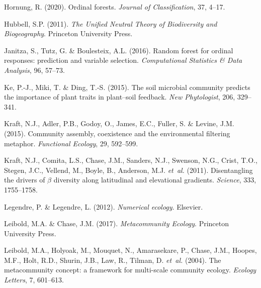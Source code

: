 \begin{thebibliography}{70}
	Hornung, R. (2020).
	\newblock Ordinal forests.
	\newblock \emph{Journal of Classification}, 37, 4--17.
	
	Hubbell, S.P. (2011).
	\newblock \emph{The Unified Neutral Theory of Biodiversity and Biogeography}.
	\newblock Princeton University Press.
	
	Janitza, S., Tutz, G. \& Boulesteix, A.L. (2016).
	\newblock Random forest for ordinal responses: prediction and variable
	selection.
	\newblock \emph{Computational Statistics \& Data Analysis}, 96, 57--73.
	
	Ke, P.-J., Miki, T. \& Ding, T.-S. (2015).
	\newblock The soil microbial community predicts the importance of plant traits
	in plant--soil feedback.
	\newblock \emph{New Phytologist}, 206, 329--341.
	
	Kraft, N.J., Adler, P.B., Godoy, O., James, E.C., Fuller, S. \& Levine, J.M.
	(2015).
	\newblock Community assembly, coexistence and the environmental filtering
	metaphor.
	\newblock \emph{Functional Ecology}, 29, 592--599.
	
	Kraft, N.J., Comita, L.S., Chase, J.M., Sanders, N.J., Swenson, N.G., Crist,
	T.O., Stegen, J.C., Vellend, M., Boyle, B., Anderson, M.J. \emph{et~al.}
	(2011).
	\newblock Disentangling the drivers of $\beta$ diversity along latitudinal and
	elevational gradients.
	\newblock \emph{Science}, 333, 1755--1758.
	
	Legendre, P. \& Legendre, L. (2012).
	\newblock \emph{Numerical ecology}.
	\newblock Elsevier.
	
	Leibold, M.A. \& Chase, J.M. (2017).
	\newblock \emph{Metacommunity Ecology}.
	\newblock Princeton University Press.
	
	Leibold, M.A., Holyoak, M., Mouquet, N., Amarasekare, P., Chase, J.M., Hoopes,
	M.F., Holt, R.D., Shurin, J.B., Law, R., Tilman, D. \emph{et~al.} (2004).
	\newblock The metacommunity concept: a framework for multi-scale community
	ecology.
	\newblock \emph{Ecology Letters}, 7, 601--613.
	

\end{thebibliography}

